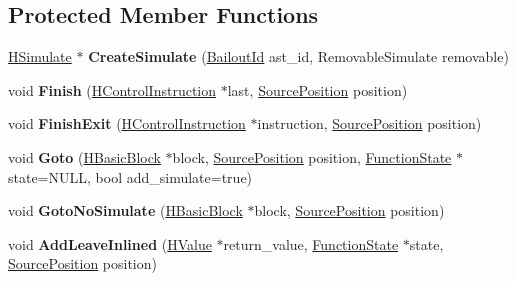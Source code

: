 \subsection*{Protected Member Functions}
\begin{DoxyCompactItemize}
\item 
\hyperlink{classv8_1_1internal_1_1_h_simulate}{H\+Simulate} $\ast$ {\bfseries Create\+Simulate} (\hyperlink{classv8_1_1internal_1_1_bailout_id}{Bailout\+Id} ast\+\_\+id, Removable\+Simulate removable)\hypertarget{classv8_1_1internal_1_1_h_basic_block_a3dce2683113482f04300e6912377b7a6}{}\label{classv8_1_1internal_1_1_h_basic_block_a3dce2683113482f04300e6912377b7a6}

\item 
void {\bfseries Finish} (\hyperlink{classv8_1_1internal_1_1_h_control_instruction}{H\+Control\+Instruction} $\ast$last, \hyperlink{classv8_1_1internal_1_1_source_position}{Source\+Position} position)\hypertarget{classv8_1_1internal_1_1_h_basic_block_a9103dd6d0bf641d21f556909ccf311fa}{}\label{classv8_1_1internal_1_1_h_basic_block_a9103dd6d0bf641d21f556909ccf311fa}

\item 
void {\bfseries Finish\+Exit} (\hyperlink{classv8_1_1internal_1_1_h_control_instruction}{H\+Control\+Instruction} $\ast$instruction, \hyperlink{classv8_1_1internal_1_1_source_position}{Source\+Position} position)\hypertarget{classv8_1_1internal_1_1_h_basic_block_a35cf7770b243be5f94a2fa4abc6c48e2}{}\label{classv8_1_1internal_1_1_h_basic_block_a35cf7770b243be5f94a2fa4abc6c48e2}

\item 
void {\bfseries Goto} (\hyperlink{classv8_1_1internal_1_1_h_basic_block}{H\+Basic\+Block} $\ast$block, \hyperlink{classv8_1_1internal_1_1_source_position}{Source\+Position} position, \hyperlink{classv8_1_1internal_1_1_function_state}{Function\+State} $\ast$state=N\+U\+LL, bool add\+\_\+simulate=true)\hypertarget{classv8_1_1internal_1_1_h_basic_block_afb3212eb6ff5a9f466b86fcbc876da70}{}\label{classv8_1_1internal_1_1_h_basic_block_afb3212eb6ff5a9f466b86fcbc876da70}

\item 
void {\bfseries Goto\+No\+Simulate} (\hyperlink{classv8_1_1internal_1_1_h_basic_block}{H\+Basic\+Block} $\ast$block, \hyperlink{classv8_1_1internal_1_1_source_position}{Source\+Position} position)\hypertarget{classv8_1_1internal_1_1_h_basic_block_a378af15631c7c7256ed6c9d840df48a5}{}\label{classv8_1_1internal_1_1_h_basic_block_a378af15631c7c7256ed6c9d840df48a5}

\item 
void {\bfseries Add\+Leave\+Inlined} (\hyperlink{classv8_1_1internal_1_1_h_value}{H\+Value} $\ast$return\+\_\+value, \hyperlink{classv8_1_1internal_1_1_function_state}{Function\+State} $\ast$state, \hyperlink{classv8_1_1internal_1_1_source_position}{Source\+Position} position)\hypertarget{classv8_1_1internal_1_1_h_basic_block_adef63a7b86ad61dfc10df94acbe2a742}{}\label{classv8_1_1internal_1_1_h_basic_block_adef63a7b86ad61dfc10df94acbe2a742}

\end{DoxyCompactItemize}
